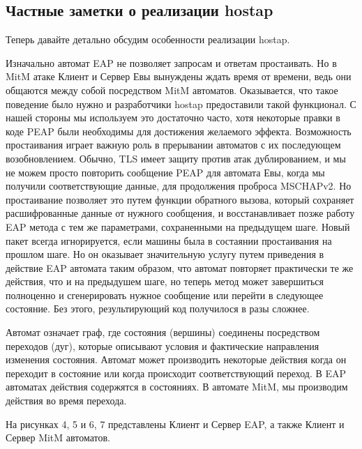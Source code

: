 \documentclass[oneside, final, 14pt]{extarticle}
\begin{document}
\subsection{Частные заметки о реализации hostap}

Теперь давайте детально обсудим особенности реализации hostap.

Изначально автомат EAP не позволяет запросам и ответам простаивать.
Но в MitM атаке Клиент и Сервер Евы вынуждены ждать
время от времени, ведь они общаются между собой посредством
MitM автоматов.
Оказывается, что такое поведение было нужно и разработчики hostap
предоставили такой функционал.
С нашей стороны мы используем это достаточно часто,
хотя некоторые правки в коде PEAP были необходимы
для достижения желаемого эффекта.
Возможность простаивания играет важную роль в прерывании
автоматов с их последующем возобновлением.
Обычно, TLS имеет защиту против атак дублированием,
и мы не можем просто повторить сообщение PEAP для автомата Евы,
когда мы получили соответствующие данные,
для продолжения проброса MSCHAPv2.
Но простаивание позволяет это путем функции обратного вызова,
который сохраняет расшифрованные данные от нужного сообщения,
и восстанавливает позже работу EAP метода с тем же параметрами,
сохраненными на предыдущем шаге.
Новый пакет всегда игнорируется, если машины была в состаянии
простаивания на прошлом шаге.
Но он оказывает значительную услугу путем приведения в действие
EAP автомата таким образом, что автомат повторяет практически
те же действия, что и на предыдушем шаге, но теперь
метод может завершиться полноценно и сгенерировать нужное сообщение
или перейти в следующее состояние.
Без этого, результирующий код получилося в разы сложнее.

Автомат означает граф, где состояния (вершины) соединены
посредством переходов (дуг), которые описывают условия и фактические
направления изменения состояния.
Автомат может производить некоторые действия когда он переходит
в состояние или когда происходит соответствующий переход.
В EAP автоматах действия содержятся в состояниях.
В автомате MitM, мы производим действия во время перехода.

На рисунках 4, 5 и 6, 7 представлены Клиент и Сервер EAP,
а также Клиент и Сервер MitM автоматов.
\end{document}
